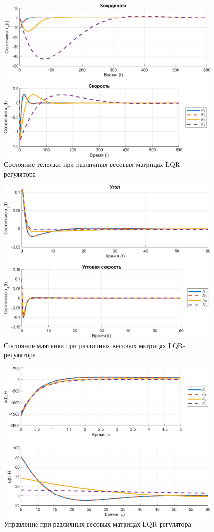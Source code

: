 \begin{figure}[H]
    \centering
    \includegraphics[width=0.8\linewidth]{figs/6.2.sim.x.png}
    \caption{Состояние тележки при различных весовых 
    матрицах LQR-регулятора}
    \label{fig:6.2.sim.x}
\end{figure}

\begin{figure}[H]
    \centering
    \includegraphics[width=0.8\linewidth]{figs/6.2.sim.phi.png}
    \caption{Состояние маятника при различных весовых матрицах LQR-регулятора}
    \label{fig:6.2.sim.phi}
\end{figure}

\begin{figure}[H]
    \centering
    \includegraphics[width=0.8\linewidth]{figs/6.2.sim.u.png}
    \caption{Управление при различных весовых матрицах LQR-регулятора}
    \label{fig:6.2.sim.u}
\end{figure}

